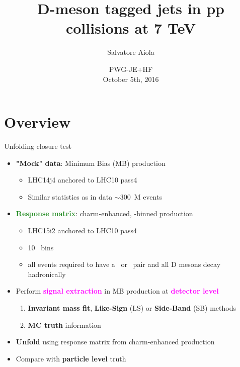 \documentclass[xcolor={usenames,dvipsnames}]{beamer}
\title[D-tagged jets in pp collisions at 7 TeV] %
{D-meson tagged jets in pp collisions at 7 TeV}
\author[Salvatore Aiola]%
{Salvatore Aiola}
\institute[Yale University] %
{Yale University}
\date[PWG-JE+HF - Oct. 5th, 2016] %
{PWG-JE+HF \\
October 5th, 2016}
\begin{document}
\begin{frame}
  \titlepage
\end{frame}





\section{Overview}
\begin{frame}{Unfolding closure test}
\begin{itemize}
\item \textbf{\textcolor{BrickRed}{"Mock" data}}: Minimum Bias (MB) production
\begin{itemize}
\item LHC14j4 anchored to LHC10 pass4
\item Similar statistics as in data $\sim 300$~M events
\end{itemize}
\item \textbf{\textcolor{ForestGreen}{Response matrix}}: charm-enhanced, \pthard-binned production
\begin{itemize}
\item LHC15i2 anchored to LHC10 pass4
\item 10 \pthard\ bins
\item all events required to have a \ccbar\ or \bbbar\ pair and all D mesons decay hadronically
\end{itemize}
\item Perform \textbf{\textcolor{Fuchsia}{signal extraction}} in MB production at \textbf{\textcolor{Fuchsia}{detector level}}
\begin{enumerate}
\item \textbf{Invariant mass fit}, \textbf{Like-Sign} (LS) or \textbf{Side-Band} (SB) methods
\item \textbf{MC truth} information
\end{enumerate}
\item \textbf{\textcolor{NavyBlue}{Unfold}} using response matrix from charm-enhanced production
\item Compare with \textbf{\textcolor{NavyBlue}{particle level}} truth
\end{itemize}
\end{frame}
\end{document}
